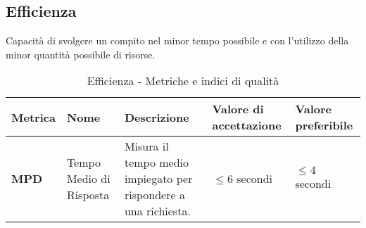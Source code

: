 \subsection{Efficienza}
Capacità di svolgere un compito nel minor tempo possibile e con l’utilizzo della minor quantità possibile di risorse. 
\begin{table}[H]
    \centering
    \begin{tabular}{|C{1.5cm}|L{3cm}|L{4cm}|L{2.5cm}|L{2.5cm}|}
        \hline
        \textbf{Metrica} & \textbf{Nome} & \textbf{Descrizione} & \textbf{Valore di accettazione} & \textbf{Valore preferibile} \\
        \hline
        \textbf{MPD} & Tempo Medio di Risposta & Misura il tempo medio impiegato per rispondere a una richiesta. & $\leq 6$ secondi & $\leq 4$ secondi \\
        \hline
    \end{tabular}
    \caption{Efficienza - Metriche e indici di qualità}
    \label{tab:efficienza_qualita_prodotto}
\end{table}

